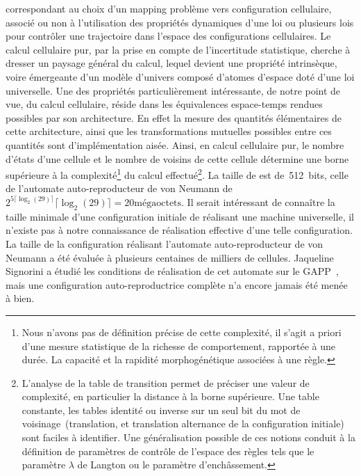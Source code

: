 correspondant au choix d'un mapping problème vers configuration cellulaire,
associé ou non à l'utilisation des propriétés dynamiques d'une loi ou
plusieurs lois pour contrôler une trajectoire dans l'espace des
configurations cellulaires. %
Le calcul cellulaire pur, par la prise en compte de l'incertitude
statistique, cherche à dresser un paysage général du calcul,
lequel devient une propriété intrinsèque, voire émergeante d'un modèle
d'univers composé d'atomes d'espace doté d'une loi universelle. %
Une des propriétés particulièrement intéressante, de notre point de
vue, du calcul cellulaire, réside dans les équivalences espace-temps
rendues possibles par son architecture. %
En effet la mesure des quantités élémentaires de cette architecture,
ainsi que les transformations mutuelles possibles entre ces quantités
sont d'implémentation aisée. %
Ainsi, en calcul cellulaire pur, le nombre d'états d'une cellule et le
nombre de voisins de cette cellule détermine une borne supérieure à la
complexité\footnote{%
  Nous n'avons pas de définition précise de cette complexité,
  il s'agit a priori d'une mesure statistique de la richesse de
  comportement, rapportée à une durée. %
  La capacité et la rapidité morphogénétique associées à une règle.} %
du calcul effectué\footnote{%
  L'analyse de la table de transition permet de préciser une valeur
  de complexité, en particulier la distance à la borne supérieure. %
  Une table constante, les tables identité ou inverse sur un seul
  bit du mot de voisinage~(translation, et translation alternance de
  la configuration initiale) sont faciles à identifier. %
  Une généralisation possible de ces notions conduit à la définition
  de paramètres de contrôle de l'espace des règles tels que le
  paramètre $\lambda$ de Langton ou le paramètre d'enchâssement.}. %
La taille de  est de~512~bits,
celle de l'automate auto-reproducteur de von Neumann de
$2^{5\lceil\log_{2}(29)\rceil}\lceil\log_{2}(29)\rceil =
20 \text{m\'egaoctets}$. %
Il serait intéressant de connaître la taille minimale d'une
configuration initiale de  réalisant une machine
universelle, il n'existe pas à notre connaissance de réalisation
effective d'une telle configuration. %
La taille de la configuration réalisant l'automate auto-reproducteur
de von Neumann a été évaluée à plusieurs centaines de milliers de
cellules. %
Jaqueline Signorini a étudié les conditions de réalisation de cet
automate sur le GAPP~\cite[]{Signorini92}, mais une configuration
auto-reproductrice complète n'a encore jamais été menée à bien. %


